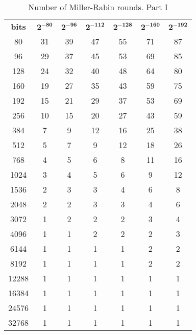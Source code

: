 \documentclass[synpaper]{book}
\begin{document}
\begin{table}[h]
\begin{center}
\begin{tabular}{c c c c c c c}
\textbf{bits} & $\mathbf{2^{-80}}$ & $\mathbf{2^{-96}}$ & $\mathbf{2^{-112}}$ & $\mathbf{2^{-128}}$ & $\mathbf{2^{-160}}$ & $\mathbf{2^{-192}}$ \\
80    & 31 & 39 & 47 & 55 & 71 & 87  \\
96    & 29 & 37 & 45 & 53 & 69 & 85  \\
128   & 24 & 32 & 40 & 48 & 64 & 80  \\
160   & 19 & 27 & 35 & 43 & 59 & 75  \\
192   & 15 & 21 & 29 & 37 & 53 & 69  \\
256   & 10 & 15 & 20 & 27 & 43 & 59  \\
384   & 7  & 9  & 12 & 16 & 25 & 38  \\
512   & 5  & 7  & 9  & 12 & 18 & 26  \\
768   & 4  & 5  & 6  & 8  & 11 & 16  \\
1024  & 3  & 4  & 5  & 6  & 9  & 12  \\
1536  & 2  & 3  & 3  & 4  & 6  & 8   \\
2048  & 2  & 2  & 3  & 3  & 4  & 6   \\
3072  & 1  & 2  & 2  & 2  & 3  & 4   \\
4096  & 1  & 1  & 2  & 2  & 2  & 3   \\
6144  & 1  & 1  & 1  & 1  & 2  & 2   \\
8192  & 1  & 1  & 1  & 1  & 2  & 2   \\
12288 & 1  & 1  & 1  & 1  & 1  & 1   \\
16384 & 1  & 1  & 1  & 1  & 1  & 1   \\
24576 & 1  & 1  & 1  & 1  & 1  & 1   \\
32768 & 1  & 1  & 1  & 1  & 1  & 1
\end{tabular}
\caption{ Number of Miller-Rabin rounds. Part I } \label{table:millerrabinrunsp1}
\end{center}
\end{table}
\newpage
\end{document}
